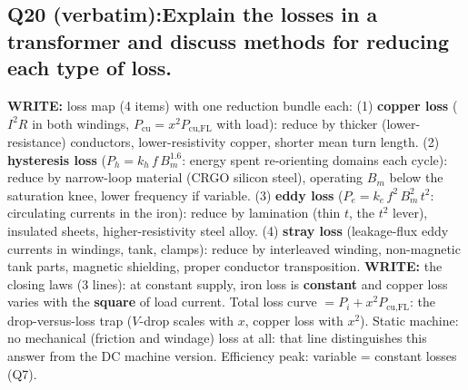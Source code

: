 \documentclass[11pt]{article}
\newcommand{\q}[2]{\subsection*{\color{copper}#1\quad\color{iron}#2}}
\newcommand{\w}[1]{\textbf{\color{copper}WRITE:} #1}
\begin{document}
\q{Q20 (verbatim):}{Explain the losses in a transformer and discuss methods for reducing each type of loss.}
\w{loss map (4 items) with one reduction bundle each:} (1) \textbf{copper loss} ($I^{2}R$ in both windings, $P_{\text{cu}} = x^{2} P_{\text{cu,FL}}$ with load): reduce by thicker (lower-resistance) conductors, lower-resistivity copper, shorter mean turn length. (2) \textbf{hysteresis loss} ($P_h = k_h\, f\, B_m^{1.6}$: energy spent re-orienting domains each cycle): reduce by narrow-loop material (CRGO silicon steel), operating $B_m$ below the saturation knee, lower frequency if variable. (3) \textbf{eddy loss} ($P_e = k_e\, f^{2}\, B_m^{2}\, t^{2}$: circulating currents in the iron): reduce by lamination (thin $t$, the $t^{2}$ lever), insulated sheets, higher-resistivity steel alloy. (4) \textbf{stray loss} (leakage-flux eddy currents in windings, tank, clamps): reduce by interleaved winding, non-magnetic tank parts, magnetic shielding, proper conductor transposition.
\w{the closing laws (3 lines):} at constant supply, iron loss is \textbf{constant} and copper loss varies with the \textbf{square} of load current. Total loss curve $= P_i + x^{2} P_{\text{cu,FL}}$: the drop-versus-loss trap ($V$-drop scales with $x$, copper loss with $x^{2}$). Static machine: no mechanical (friction and windage) loss at all: that line distinguishes this answer from the DC machine version. Efficiency peak: variable = constant losses (Q7).

\hrulefill
\end{document}
